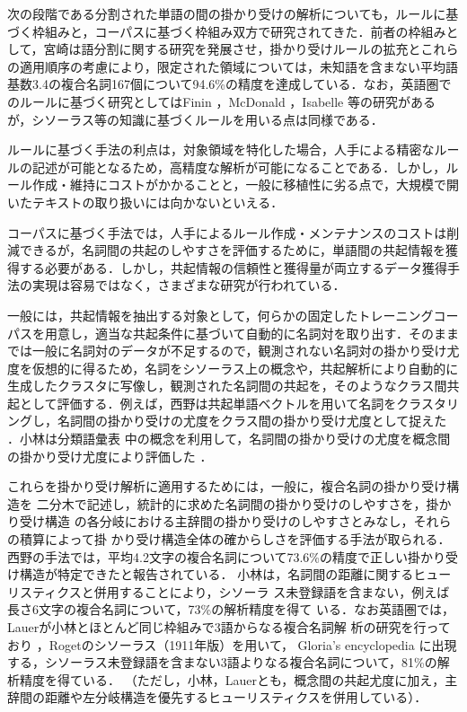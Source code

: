 次の段階である分割された単語の間の掛かり受けの解析についても，ルールに基づく枠組みと，コーパスに基づく枠組み双方で研究されてきた．前者の枠組みとして，宮崎は語分割に関する研究を発展させ，掛かり受けルールの拡充とこれらの適用順序の考慮により，限定された領域については，未知語を含まない平均語基数3.4の複合名詞167個について94.6\%の精度を達成している\cite{宮崎1993}．なお，英語圏でのルールに基づく研究としてはFinin \cite{Finin1980}，McDonald \cite{McDonald1982}，Isabelle \cite{Isabelle1984}等の研究があるが，シソーラス等の知識に基づくルールを用いる点は同様である．

ルールに基づく手法の利点は，対象領域を特化した場合，人手による精密なルールの記述が可能となるため，高精度な解析が可能になることである．しかし，ルール作成・維持にコストがかかることと，一般に移植性に劣る点で，大規模で開いたテキストの取り扱いには向かないといえる．

コーパスに基づく手法では，人手によるルール作成・メンテナンスのコストは削減できるが，名詞間の共起のしやすさを評価するために，単語間の共起情報を獲得する必要がある．しかし，共起情報の信頼性と獲得量が両立するデータ獲得手法の実現は容易ではなく，さまざまな研究が行われている．

一般には，共起情報を抽出する対象として，何らかの固定したトレーニングコーパスを用意し，適当な共起条件に基づいて自動的に名詞対を取り出す．そのままでは一般に名詞対のデータが不足するので，観測されない名詞対の掛かり受け尤度を仮想的に得るため，名詞をシソーラス上の概念や，共起解析により自動的に生成したクラスタに写像し，観測された名詞間の共起を，そのようなクラス間共起として評価する．例えば，西野は共起単語ベクトルを用いて名詞をクラスタリングし，名詞間の掛かり受けの尤度をクラス間の掛かり受け尤度として捉えた \cite{西野1988}．小林は分類語彙表 \cite{林1966}中の概念を利用して，名詞間の掛かり受けの尤度を概念間の掛かり受け尤度により評価した \cite{小林1996}．

これらを掛かり受け解析に適用するためには，一般に，複合名詞の掛かり受け構造を
二分木で記述し，統計的に求めた名詞間の掛かり受けのしやすさを，掛かり受け構造
の各分岐における主辞間の掛かり受けのしやすさとみなし，それらの積算によって掛
かり受け構造全体の確からしさを評価する手法が取られる．
西野の手法では，平均4.2文字の複合名詞について73.6\%の精度で正しい掛かり受け構造が特定できたと報告されている．
小林は，名詞間の距離に関するヒューリスティクスと併用することにより，シソーラ
ス未登録語を含まない，例えば長さ6文字の複合名詞について，73\%の解析精度を得て
いる．なお英語圏では，Lauerが小林とほとんど同じ枠組みで3語からなる複合名詞解
析の研究を行っており \cite{Lauer1995}，Rogetのシソーラス（1911年版）を用いて，
Gloria's encyclopedia に出現する，シソーラス未登録語を含まない3語よりなる複合名詞について，81\%の解析精度を得ている．
（ただし，小林，Lauerとも，概念間の共起尤度に加え，主辞間の距離や左分岐構造を優先するヒューリスティクスを併用している）．

